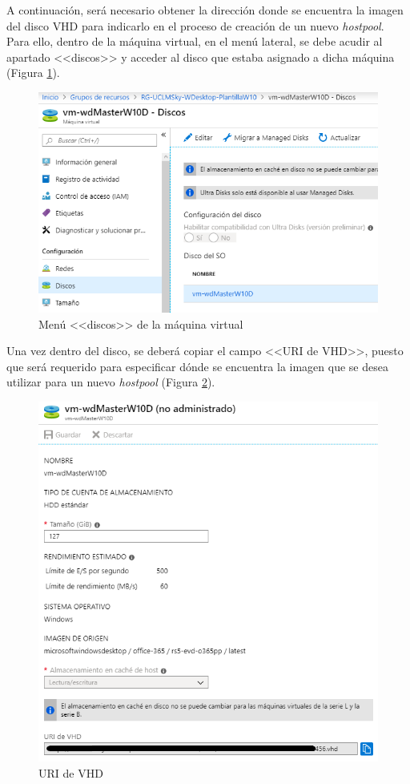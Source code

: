 A continuación, será necesario obtener la dirección donde se encuentra la imagen del disco \acs{VHD} para indicarlo en el proceso de creación de un nuevo \textit{hostpool}. Para ello, dentro de la máquina virtual, en el menú lateral, se debe acudir al apartado <<discos>> y acceder al disco que estaba asignado a dicha máquina (Figura \ref{fig:menudiscos}).

\clearpage

\begin{figure}[h]
  \centering
  \includegraphics[width=0.5\linewidth]{figures/images/casos_uso/discosVM.PNG}
  \caption{Menú <<discos>> de la máquina virtual}
  \label{fig:menudiscos}
\end{figure}

Una vez dentro del disco, se deberá copiar el campo <<\acs{URI} de \acs{VHD}>>, puesto que será requerido para especificar dónde se encuentra la imagen que se desea utilizar para un nuevo \textit{hostpool} (Figura \ref{fig:uri_vhd}).

\begin{figure}[h]
  \centering
  \includegraphics[width=0.7\linewidth]{figures/images/casos_uso/uri_vhd.PNG}
  \caption{\acs{URI} de \acs{VHD}}
  \label{fig:uri_vhd}
\end{figure}


